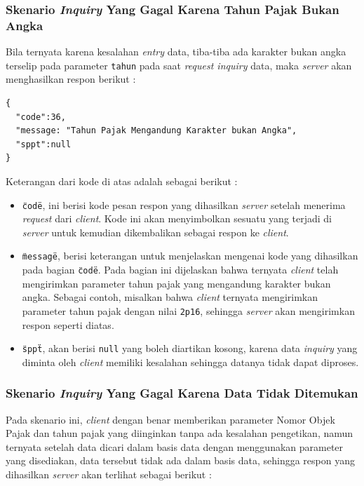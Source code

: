 \documentclass[pdftex,12pt, oneside]{article}
\begin{document}
\subsubsection{Skenario \textit{Inquiry} Yang Gagal Karena Tahun Pajak Bukan Angka}

  Bila ternyata karena kesalahan \textit{entry} data, tiba-tiba ada karakter bukan angka terselip pada parameter \texttt{tahun} pada saat \textit{request inquiry} data, maka \textit{server} akan menghasilkan respon berikut :

  \begin{lstlisting}
{
  "code":36,
  "message: "Tahun Pajak Mengandung Karakter bukan Angka",
  "sppt":null
}
  \end{lstlisting}

  Keterangan dari kode di atas adalah sebagai berikut :

  \begin{itemize}
    \item \texttt{\"code\"}, ini berisi kode pesan respon yang dihasilkan \textit{server} setelah menerima \textit{request} dari \textit{client}. Kode ini akan menyimbolkan sesuatu yang terjadi di \textit{server} untuk kemudian dikembalikan sebagai respon ke \textit{client}.
    
    \item \texttt{\"message\"}, berisi keterangan untuk menjelaskan mengenai kode yang dihasilkan pada bagian \texttt{\"code\"}. Pada bagian ini dijelaskan bahwa ternyata \textit{client} telah mengirimkan parameter tahun pajak yang mengandung karakter bukan angka. Sebagai contoh, misalkan bahwa \textit{client} ternyata mengirimkan parameter tahun pajak dengan nilai \texttt{2p16}, sehingga \textit{server} akan mengirimkan respon seperti diatas.
    
    \item \texttt{\"sppt\"}, akan berisi \texttt{null} yang boleh diartikan kosong, karena data \textit{inquiry} yang diminta oleh \textit{client} memiliki kesalahan sehingga datanya tidak dapat diproses.
  \end{itemize}

\subsubsection{Skenario \textit{Inquiry} Yang Gagal Karena Data Tidak Ditemukan}

  Pada skenario ini, \textit{client} dengan benar memberikan parameter Nomor Objek Pajak dan tahun pajak yang diinginkan tanpa ada kesalahan pengetikan, namun ternyata setelah data dicari dalam basis data dengan menggunakan parameter yang disediakan, data tersebut tidak ada dalam basis data, sehingga respon yang dihasilkan \textit{server} akan terlihat sebagai berikut :
  
\end{document}
